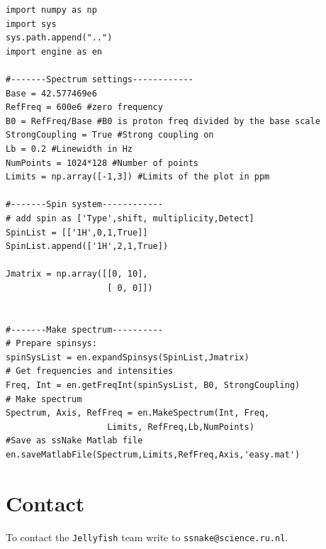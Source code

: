 \documentclass[11pt,a4paper]{article}
\begin{document}
\lstset{language=python} 
\begin{lstlisting}[frame=single]  
import numpy as np
import sys
sys.path.append("..")
import engine as en

#-------Spectrum settings------------
Base = 42.577469e6
RefFreq = 600e6 #zero frequency
B0 = RefFreq/Base #B0 is proton freq divided by the base scale
StrongCoupling = True #Strong coupling on
Lb = 0.2 #Linewidth in Hz
NumPoints = 1024*128 #Number of points
Limits = np.array([-1,3]) #Limits of the plot in ppm

#-------Spin system------------
# add spin as ['Type',shift, multiplicity,Detect]
SpinList = [['1H',0,1,True]] 
SpinList.append(['1H',2,1,True])

Jmatrix = np.array([[0, 10],
                    [ 0, 0]])


#-------Make spectrum----------
# Prepare spinsys:
spinSysList = en.expandSpinsys(SpinList,Jmatrix) 
# Get frequencies and intensities
Freq, Int = en.getFreqInt(spinSysList, B0, StrongCoupling) 
# Make spectrum
Spectrum, Axis, RefFreq = en.MakeSpectrum(Int, Freq, 
					Limits, RefFreq,Lb,NumPoints) 
#Save as ssNake Matlab file
en.saveMatlabFile(Spectrum,Limits,RefFreq,Axis,'easy.mat')
\end{lstlisting}


\section{Contact}
To contact the \texttt{Jellyfish} team write to \texttt{ssnake@science.ru.nl}.


\end{document}
